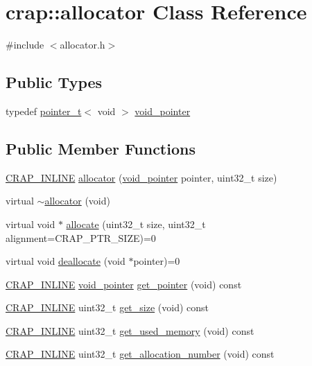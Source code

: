 \hypertarget{classcrap_1_1allocator}{\section{crap\+:\+:allocator Class Reference}
\label{classcrap_1_1allocator}
}


{\ttfamily \#include $<$allocator.\+h$>$}

\subsection*{Public Types}
\begin{DoxyCompactItemize}
\item 
typedef \hyperlink{structcrap_1_1pointer__t}{pointer\+\_\+t}$<$ void $>$ \hyperlink{classcrap_1_1allocator_a0c96f829f4199eeb4b6a94c64b572f9c}{void\+\_\+pointer}
\end{DoxyCompactItemize}
\subsection*{Public Member Functions}
\begin{DoxyCompactItemize}
\item 
\hyperlink{config__x86_8h_a5a40526b8d842e7ff731509998bb0f1c}{C\+R\+A\+P\+\_\+\+I\+N\+L\+I\+N\+E} \hyperlink{classcrap_1_1allocator_ae6a556911f6eed146f803c98dea93f55}{allocator} (\hyperlink{classcrap_1_1allocator_a0c96f829f4199eeb4b6a94c64b572f9c}{void\+\_\+pointer} pointer, uint32\+\_\+t size)
\item 
virtual \hyperlink{classcrap_1_1allocator_a1a0b8fea96313726684c9730f407192d}{$\sim$allocator} (void)
\item 
virtual void $\ast$ \hyperlink{classcrap_1_1allocator_adf3d4488f3e0a84111205658fcd96e25}{allocate} (uint32\+\_\+t size, uint32\+\_\+t alignment=C\+R\+A\+P\+\_\+\+P\+T\+R\+\_\+\+S\+I\+Z\+E)=0
\item 
virtual void \hyperlink{classcrap_1_1allocator_a687baac32924015af6acb97c604de99b}{deallocate} (void $\ast$pointer)=0
\item 
\hyperlink{config__x86_8h_a5a40526b8d842e7ff731509998bb0f1c}{C\+R\+A\+P\+\_\+\+I\+N\+L\+I\+N\+E} \hyperlink{classcrap_1_1allocator_a0c96f829f4199eeb4b6a94c64b572f9c}{void\+\_\+pointer} \hyperlink{classcrap_1_1allocator_a6713e2d0070b80855430380268d453a4}{get\+\_\+pointer} (void) const 
\item 
\hyperlink{config__x86_8h_a5a40526b8d842e7ff731509998bb0f1c}{C\+R\+A\+P\+\_\+\+I\+N\+L\+I\+N\+E} uint32\+\_\+t \hyperlink{classcrap_1_1allocator_a717b14a3405fb3ea590155ea5580d1e5}{get\+\_\+size} (void) const 
\item 
\hyperlink{config__x86_8h_a5a40526b8d842e7ff731509998bb0f1c}{C\+R\+A\+P\+\_\+\+I\+N\+L\+I\+N\+E} uint32\+\_\+t \hyperlink{classcrap_1_1allocator_a2fc2cf7b7230a62ac37171353d7f9a0c}{get\+\_\+used\+\_\+memory} (void) const 
\item 
\hyperlink{config__x86_8h_a5a40526b8d842e7ff731509998bb0f1c}{C\+R\+A\+P\+\_\+\+I\+N\+L\+I\+N\+E} uint32\+\_\+t \hyperlink{classcrap_1_1allocator_a52206ffa1d092281ec7c0e927da30ca4}{get\+\_\+allocation\+\_\+number} (void) const 
\end{DoxyCompactItemize}


